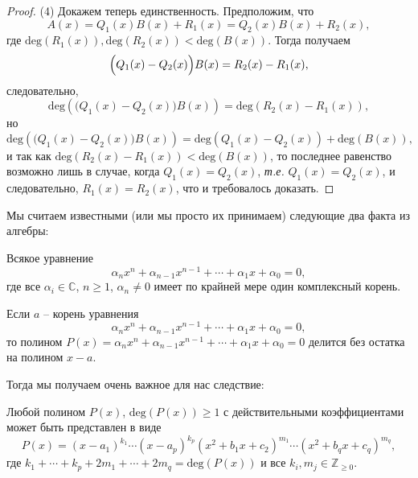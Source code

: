 \begin{proof}
(4) Докажем теперь единственность. Предположим, что
\[
 A(x)  = Q_1(x) B(x) + R_1(x) =  Q_2(x) B(x) + R_2(x),
\]
где $\mathrm{deg}(R_1(x)), \mathrm{deg}(R_2(x)) < \mathrm{deg}(B(x))$. Тогда получаем
\[
\Bigl(Q_1(x) - Q_2(x)\Bigr) B(x) = R_2(x) - R_1(x),
\]
следовательно,
\[
 \mathrm{deg}\left((Q_1(x) - Q_2(x)\Bigr) B(x) \right) = \mathrm{deg}(R_2(x) -R_1(x)),
\]
но
\[
 \mathrm{deg}\left((Q_1(x) - Q_2(x)\Bigr) B(x) \right) = \mathrm{deg}(Q_1(x) - Q_2(x)) + \mathrm{deg}(B(x)),
\]
и так как $\mathrm{deg}(R_2(x) - R_1(x)) < \mathrm{deg}(B(x))$, то последнее равенство возможно лишь в случае, когда $Q_1(x) = Q_2(x)$, \textit{т.е.} $Q_1(x) = Q_2(x)$, и следовательно, $R_1(x) = R_2(x)$, что и требовалось доказать.
\end{proof}

Мы считаем известными (или мы просто их принимаем) следующие два факта из алгебры:

\begin{theorem}
    Всякое уравнение
    \[
     \alpha_n x^n + \alpha_{n-1}x^{n-1} + \cdots + \alpha_1 x + \alpha_0 =0,
    \]
    где все $\alpha_i \in \mathbb{C}$, $n\ge 1$, $\alpha_n \ne 0$ имеет по крайней мере один комплексный корень.
\end{theorem}

\begin{theorem}
    Если $a$ -- корень уравнения 
        \[
     \alpha_n x^n + \alpha_{n-1}x^{n-1} + \cdots + \alpha_1 x + \alpha_0 =0,
    \]
    то полином $P(x) = \alpha_n x^n + \alpha_{n-1}x^{n-1} + \cdots + \alpha_1 x + \alpha_0 =0$ делится без остатка на полином $x-a.$
\end{theorem}


Тогда мы получаем очень важное для нас следствие:

\begin{theorem}\label{any_polynomail_is_1+2}
    Любой полином $P(x)$, $\mathrm{deg}(P(x)) \ge 1$ с действительными коэффициентами может быть представлен в виде
    \[
     P(x) = (x - a_1)^{k_1} \cdots (x-a_p)^{k_p} (x^2 + b_1x + c_2)^{m_1}\cdots (x^2 + b_qx + c_q)^{m_q}, 
    \]
    где $k_1 + \cdots + k_p + 2m_1 + \cdots + 2m_q = \mathrm{deg}(P(x))$ и все $k_i, m_j \in \mathbb{Z}_{\ge 0}.$
\end{theorem}

